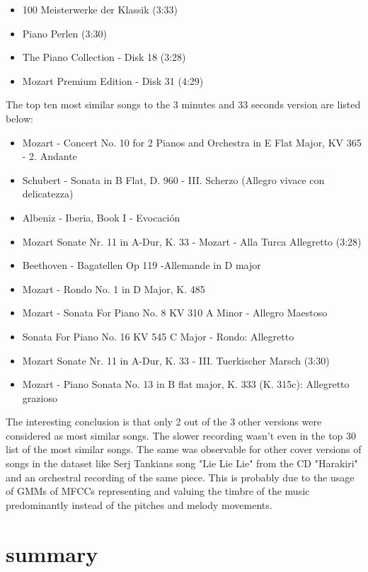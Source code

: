 \begin{itemize}
	\setlength\itemsep{0em}
	\item 100 Meisterwerke der Klassik (3:33)
	\item Piano Perlen (3:30)
	\item The Piano Collection - Disk 18 (3:28)
	\item Mozart Premium Edition - Disk 31 (4:29)
	
\end{itemize}
The top ten most similar songs to the 3 minutes and 33 seconds version are listed below:
\begin{itemize}
	\setlength\itemsep{0em}
	\item Mozart - Concert No. 10 for 2 Pianos and Orchestra in E Flat Major, KV 365 - 2. Andante
	\item Schubert - Sonata in B Flat, D. 960 - III. Scherzo (Allegro vivace con delicatezza)
	\item Albeniz - Iberia, Book I - Evocaci\'on
	\item Mozart Sonate Nr. 11 in A-Dur, K. 33 - Mozart - Alla Turca Allegretto (3:28)
	\item Beethoven - Bagatellen Op 119 -Allemande in D major
	\item Mozart - Rondo No. 1 in D Major, K. 485
	\item Mozart - Sonata For Piano No. 8 KV 310 A Minor - Allegro Maestoso
	\item Sonata For Piano No. 16 KV 545 C Major - Rondo: Allegretto
	\item Mozart Sonate Nr. 11 in A-Dur, K. 33 - III. Tuerkischer Marsch (3:30)
	\item Mozart - Piano Sonata No. 13 in B flat major, K. 333 (K. 315c): Allegretto grazioso
	
\end{itemize}

The interesting conclusion is that only 2 out of the 3 other versions were considered as most similar songs.
The slower recording wasn't even in the top 30 list of the most similar songs. 
The same was observable for other cover versions of songs in the dataset like Serj Tankians song "Lie Lie Lie" from the CD "Harakiri" and an orchestral recording of the same piece. 
This is probably due to the usage of GMMs of MFCCs representing and valuing the timbre of the music predominantly instead of the pitches and melody movements.


\section{summary}


